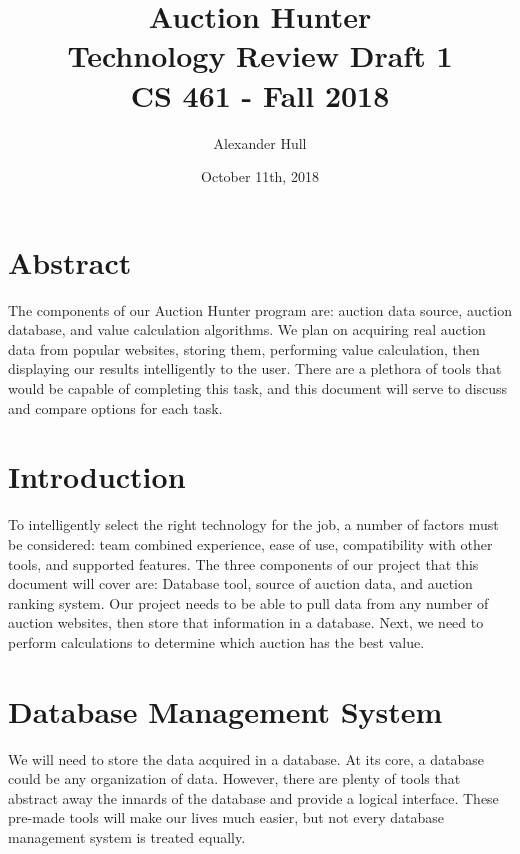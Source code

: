 \documentclass[draftclsnofoot,onecolumn,10pt]{IEEEtran}
\title{Auction Hunter \\ Technology Review Draft 1\\CS 461 - Fall 2018}
\author{Alexander Hull}
\date{October 11th, 2018}
\begin{document}
\maketitle



\section{Abstract}
The components of our Auction Hunter program are: auction data source, auction database, and value calculation algorithms. We plan on acquiring real auction data from popular websites, storing them, performing value calculation, then displaying our results intelligently to the user. There are a plethora of tools that would be capable of completing this task, and this document will serve to discuss and compare options for each task. 

\newpage

\tableofcontents


\section{Introduction}
To intelligently select the right technology for the job, a number of factors must be considered: team combined experience, ease of use, compatibility with other tools, and supported features. The three components of our project that this document will cover are: Database tool, source of auction data, and auction ranking system. Our project needs to be able to pull data from any number of auction websites, then store that information in a database. Next, we need to perform calculations to determine which auction has the best value. 


\section{Database Management System}
 We will need to store the data acquired in a database. At its core, a database could be any organization of data. However, there are plenty of tools that abstract away the innards of the database and provide a logical interface. These pre-made tools will make our lives much easier, but not every database management system is treated equally.
 
\end{document}
